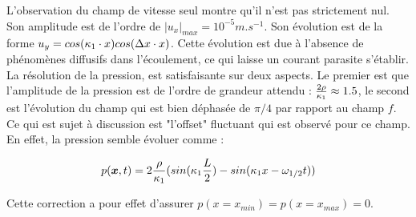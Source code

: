 L'observation du champ de vitesse seul montre qu'il n'est pas strictement nul. Son amplitude est de l'ordre de $|u_x|_{max}=10^{-5} m.s^{-1}$. Son évolution est de la forme $u_y = cos(\k_1 \cdot x)cos(\D x \cdot x)$. Cette évolution est due à l'absence de phénomènes diffusifs dans l'écoulement, ce qui laisse un courant parasite s'établir. La résolution de la pression, est satisfaisante sur deux aspects. Le premier est que l'amplitude de la pression est de l'ordre de grandeur attendu : $\frac{2\r}{\k_1}\approx 1.5$, le second est l'évolution du champ qui est bien déphasée de $\pi/4$ par rapport au champ $f$. Ce qui est sujet à discussion est "l'offset" fluctuant qui est observé pour ce champ. En effet, la pression semble évoluer comme :

\begin{align}
p(\bm{x},t) = 2 \frac{\r}{\k_1} (sin(\k_1 \frac{L}{2})- sin(\k_1 x - \o_{1/2} t) )
\end{align}

Cette correction a pour effet d'assurer $p(x=x_{min}) = p(x=x_{max}) = 0$.